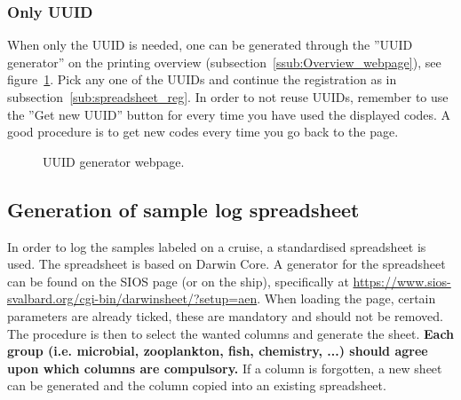 \documentclass[a4paper,english, 11pt]{article}
\begin{document}
\subsubsection{Only UUID} %
\label{ssub:Only_UUID}

When only the UUID is needed, one can be generated through the ''UUID generator'' on the printing overview (subsection~\ref{ssub:Overview_webpage}), see figure~\ref{fig:uuid_gen}. Pick any one of the UUIDs and continue the registration as in subsection~\ref{sub:spreadsheet_reg}. In order to not reuse UUIDs, remember to use the ''Get new UUID'' button for every time you have used the displayed codes. A good procedure is to get new codes every time you go back to the page.

\begin{figure}[htb]
    \caption{\label{fig:uuid_gen}
        UUID generator webpage.
    }
\end{figure}



\subsection{Generation of sample log spreadsheet} %
\label{sub:Sample_log_spreadsheet_generation}

In order to log the samples labeled on a cruise, a standardised spreadsheet is used. The spreadsheet is based on Darwin Core. A generator for the spreadsheet can be found on the SIOS page (or on the ship), specifically at \url{https://www.sios-svalbard.org/cgi-bin/darwinsheet/?setup=aen}. When loading the page, certain parameters are already ticked, these are mandatory and should not be removed.  
The procedure is then to select the wanted columns and generate the sheet. \textbf{Each group (i.e. microbial, zooplankton, fish, chemistry, ...) should agree upon which columns are compulsory.} If a column is forgotten, a new sheet can be generated and the column copied into an existing spreadsheet.
\end{document}
